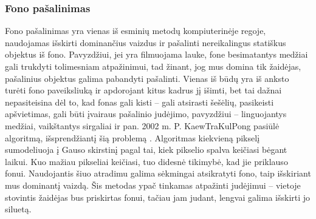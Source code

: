 \documentclass{VUMIFPSbakalaurinis}
\begin{document}
\subsubsection{Fono pašalinimas}
Fono pašalinimas yra vienas iš esminių metodų kompiuterinėje regoje, naudojamas išskirti dominančius vaizdus ir pašalinti nereikalingus statiškus objektus iš fono. Pavyzdžiui, jei yra filmuojama lauke, fone besimatantys medžiai gali trukdyti tolimesniam atpažinimui, tad žinant, jog mus domina tik žaidėjas, pašalinius objektus galima pabandyti pašalinti. Vienas iš būdų yra iš anksto turėti fono paveiksliuką ir apdorojant kitus kadrus jį išimti, bet tai dažnai nepasiteisina dėl to, kad fonas gali kisti – gali atsirasti šešėlių, pasikeisti apšvietimas, gali būti įvairaus pašalinio judėjimo, pavyzdžiui – linguojantys medžiai, vaikštantys sirgaliai ir pan. 2002 m.  P. KaewTraKulPong pasiūlė algoritmą, išsprendžiantį šią problemą \cite{KaewTraKulPong2002}. Algoritmas kiekvieną pikselį sumodeliuoja į Gauso skirstinį pagal tai, kiek pikselio spalva keičiasi bėgant laikui. Kuo mažiau pikseliai keičiasi, tuo didesnė tikimybė, kad jie priklauso fonui. Naudojantis šiuo atradimu galima sėkmingai atsikratyti fono, taip išskiriant mus dominantį vaizdą. Šis metodas ypač tinkamas atpažinti judėjimui – vietoje stovintis žaidėjas bus priskirtas fonui, tačiau jam judant, lengvai galima išskirti jo siluetą.  
\end{document}
